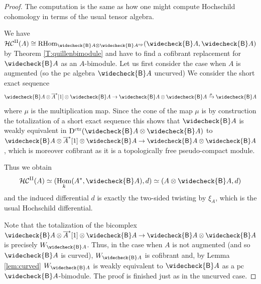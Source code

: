 \documentclass[a4paper]{amsart}
\theoremstyle{plain}
\newtheorem{thm}{Theorem}[section]
\theoremstyle{definition}
\theoremstyle{remark}
\DeclareMathOperator{\Dctr}{D^{ctr}}
\DeclareMathOperator{\End}{End}
\DeclareMathOperator{\HHIIc}{\mathcal{HC}^{\mathrm{II}}}%
\DeclareMathOperator{\Hom}{Hom}
\DeclareMathOperator{\MC}{MC}
\DeclareMathOperator{\RHom}{RHom}
\newcommand{\op}{\mathrm{op}}
\newcommand{\cB}{\widecheck{\mathsf{B}}}
\numberwithin{equation}{section}
\theoremstyle{plain}
\begin{document}
	\begin{proof}
		The computation is the same as how one might compute Hochschild cohomology in terms of the usual tensor algebra.
		
		We have $\HHIIc(A) \cong \RHom_{\cB A \otimes \cB A^\op}(\cB A, \cB A)$ by Theorem \ref{T:quillenbimodule}
		and have to find a cofibrant replacement for $\cB A$ as an $A$-bimodule. Let us first consider the case when $A$ is augmented  (so the pc algebra $\cB A$ uncurved)
		We consider the short exact sequence
		\begin{equation}\label{eq:uncurved}
			\cB A \otimes \overline{A}^*[1] \otimes \cB A \to \cB A \otimes \cB A \xrightarrow{\mu} \cB A
		\end{equation}
		where $\mu$ is the multiplication map. Since the cone of the map $\mu$ is by construction the totalization of a short exact sequence
		this shows that $\cB A$
		is weakly equivalent in $\Dctr(\cB A \otimes \cB A)$ to $\cB A \otimes \overline{A}^*[1] \otimes \cB A \to \cB A \otimes \cB A$, which is moreover cofibrant as it is a topologically free pseudo-compact module.
		
		Thus we obtain 
		$$\HHIIc(A) \simeq (\Hom_k(A^*, \cB A), d) \simeq (A \otimes \cB A, d)$$ 
		and the induced differential $d$ is exactly the two-sided twisting by $\xi_A$, which is the usual Hochschild differential.
		
		Note that the totalization of the bicomplex $\cB A \otimes \overline{A}^*[1] \otimes \cB A \to \cB A \otimes \cB A$ is precisely $W_{\cB A}$. Thus, in the case when $A$ is not augmented (and so $\cB A$ is curved), $W_{\cB A}$ is cofibrant and, by Lemma \ref{lem:curved}  $W_{\cB A}$ is weakly equivalent to $\cB A$ as a pc $\cB A$-bimodule. The proof is finished just as in the uncurved case.
	\end{proof}
	
\end{document}
